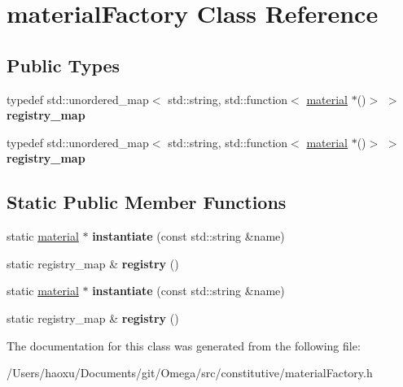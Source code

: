 \hypertarget{classmaterial_factory}{}\section{material\+Factory Class Reference}
\label{classmaterial_factory}
\subsection*{Public Types}
\begin{DoxyCompactItemize}
\item 
\mbox{\label{classmaterial_factory_ab10859f90d28f881a2f20174f0322259}} 
typedef std\+::unordered\+\_\+map$<$ std\+::string, std\+::function$<$ \hyperlink{classmaterial}{material} $\ast$()$>$ $>$ {\bfseries registry\+\_\+map}
\item 
\mbox{\label{classmaterial_factory_ab10859f90d28f881a2f20174f0322259}} 
typedef std\+::unordered\+\_\+map$<$ std\+::string, std\+::function$<$ \hyperlink{classmaterial}{material} $\ast$()$>$ $>$ {\bfseries registry\+\_\+map}
\end{DoxyCompactItemize}
\subsection*{Static Public Member Functions}
\begin{DoxyCompactItemize}
\item 
\mbox{\label{classmaterial_factory_ab32081d0b28a0fe08543cd463edcc5c9}} 
static \hyperlink{classmaterial}{material} $\ast$ {\bfseries instantiate} (const std\+::string \&name)
\item 
\mbox{\label{classmaterial_factory_a1a687414582aa4a1239c1204f075a752}} 
static registry\+\_\+map \& {\bfseries registry} ()
\item 
\mbox{\label{classmaterial_factory_ab32081d0b28a0fe08543cd463edcc5c9}} 
static \hyperlink{classmaterial}{material} $\ast$ {\bfseries instantiate} (const std\+::string \&name)
\item 
\mbox{\label{classmaterial_factory_a1a687414582aa4a1239c1204f075a752}} 
static registry\+\_\+map \& {\bfseries registry} ()
\end{DoxyCompactItemize}


The documentation for this class was generated from the following file\+:\begin{DoxyCompactItemize}
\item 
/\+Users/haoxu/\+Documents/git/\+Omega/src/constitutive/material\+Factory.\+h\end{DoxyCompactItemize}
